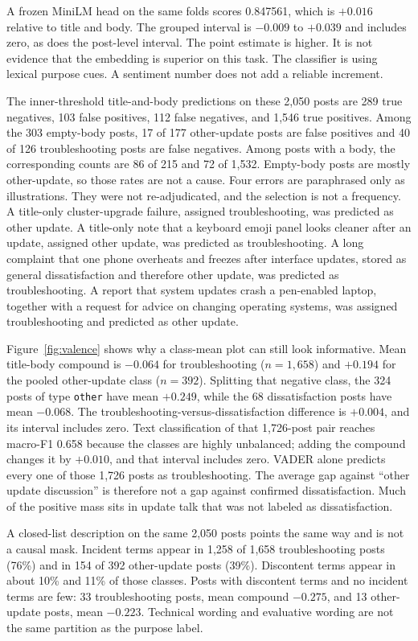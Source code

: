 \documentclass[conference,letterpaper]{IEEEtran}
\begin{document}
A frozen MiniLM head on the same folds scores 0.847561, which is $+0.016$ relative to title and body. The grouped interval is $-0.009$ to $+0.039$ and includes zero, as does the post-level interval. The point estimate is higher. It is not evidence that the embedding is superior on this task. The classifier is using lexical purpose cues. A sentiment number does not add a reliable increment.

The inner-threshold title-and-body predictions on these 2,050 posts are 289 true negatives, 103 false positives, 112 false negatives, and 1,546 true positives. Among the 303 empty-body posts, 17 of 177 other-update posts are false positives and 40 of 126 troubleshooting posts are false negatives. Among posts with a body, the corresponding counts are 86 of 215 and 72 of 1,532. Empty-body posts are mostly other-update, so those rates are not a cause. Four errors are paraphrased only as illustrations. They were not re-adjudicated, and the selection is not a frequency. A title-only cluster-upgrade failure, assigned troubleshooting, was predicted as other update. A title-only note that a keyboard emoji panel looks cleaner after an update, assigned other update, was predicted as troubleshooting. A long complaint that one phone overheats and freezes after interface updates, stored as general dissatisfaction and therefore other update, was predicted as troubleshooting. A report that system updates crash a pen-enabled laptop, together with a request for advice on changing operating systems, was assigned troubleshooting and predicted as other update.

Figure~\ref{fig:valence} shows why a class-mean plot can still look informative. Mean title-body compound is $-0.064$ for troubleshooting ($n=1{,}658$) and $+0.194$ for the pooled other-update class ($n=392$). Splitting that negative class, the 324 posts of type \texttt{other} have mean $+0.249$, while the 68 dissatisfaction posts have mean $-0.068$. The troubleshooting-versus-dissatisfaction difference is $+0.004$, and its interval includes zero. Text classification of that 1,726-post pair reaches macro-F1 0.658 because the classes are highly unbalanced; adding the compound changes it by $+0.010$, and that interval includes zero. VADER alone predicts every one of those 1,726 posts as troubleshooting. The average gap against ``other update discussion'' is therefore not a gap against confirmed dissatisfaction. Much of the positive mass sits in update talk that was not labeled as dissatisfaction.

A closed-list description on the same 2,050 posts points the same way and is not a causal mask. Incident terms appear in 1,258 of 1,658 troubleshooting posts (76\%) and in 154 of 392 other-update posts (39\%). Discontent terms appear in about 10\% and 11\% of those classes. Posts with discontent terms and no incident terms are few: 33 troubleshooting posts, mean compound $-0.275$, and 13 other-update posts, mean $-0.223$. Technical wording and evaluative wording are not the same partition as the purpose label.
\end{document}
